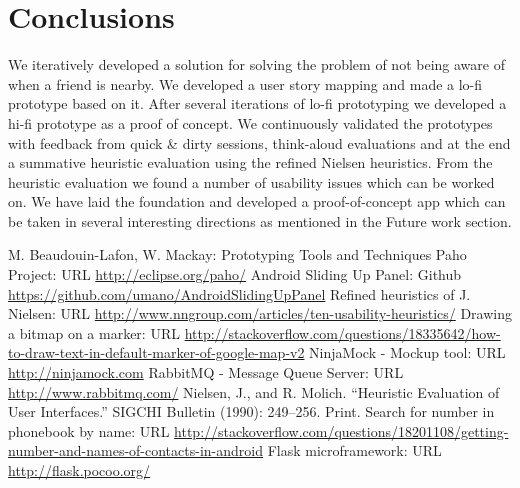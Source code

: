 \documentclass[runningheads,a4paper]{llncs}
\begin{document}
\section{Conclusions}
We iteratively developed a solution for solving the problem of not being aware of when a friend is nearby. We developed a user story mapping and made a lo-fi prototype based on it. After several iterations of lo-fi prototyping we developed a hi-fi prototype as a proof of concept. We continuously validated the prototypes with feedback from quick \& dirty sessions, think-aloud evaluations and at the end a summative heuristic evaluation using the refined Nielsen heuristics\cite{nielsenheuristics}. From the heuristic evaluation we found a number of usability issues which can be worked on. We have laid the foundation and developed a proof-of-concept app which can be taken in several interesting directions as mentioned in the Future work section.
\begin{thebibliography}{4}

 M. Beaudouin-Lafon, W. Mackay: Prototyping Tools and Techniques
 Paho Project: URL \url{http://eclipse.org/paho/}
 Android Sliding Up Panel: Github \url{https://github.com/umano/AndroidSlidingUpPanel}
Refined heuristics of J. Nielsen: URL \url{http://www.nngroup.com/articles/ten-usability-heuristics/}
 Drawing a bitmap on a marker: URL \url{http://stackoverflow.com/questions/18335642/how-to-draw-text-in-default-marker-of-google-map-v2}
 NinjaMock - Mockup tool: URL \url{http://ninjamock.com}
 RabbitMQ - Message Queue Server: URL \url{http://www.rabbitmq.com/}
Nielsen, J., and R. Molich. “Heuristic Evaluation of User Interfaces.” SIGCHI Bulletin (1990): 249–256. Print.
 Search for number in phonebook by name: URL \url{http://stackoverflow.com/questions/18201108/getting-number-and-names-of-contacts-in-android}
 Flask microframework: URL \url{http://flask.pocoo.org/}



\end{thebibliography}
\end{document}
